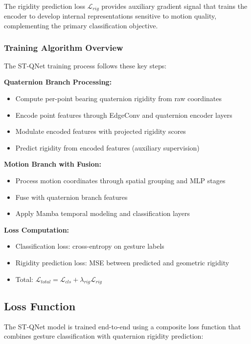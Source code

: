 \documentclass[journal]{IEEEtran}
\theoremstyle{plain}
\begin{document}
The rigidity prediction loss $\mathcal{L}_{rig}$ provides auxiliary gradient signal that trains the encoder to develop internal representations sensitive to motion quality, complementing the primary classification objective.

\subsubsection{Training Algorithm Overview}
The ST-QNet training process follows these key steps:

\textbf{Quaternion Branch Processing:}
\begin{itemize}
    \item Compute per-point bearing quaternion rigidity from raw coordinates
    \item Encode point features through EdgeConv and quaternion encoder layers
    \item Modulate encoded features with projected rigidity scores
    \item Predict rigidity from encoded features (auxiliary supervision)
\end{itemize}

\textbf{Motion Branch with Fusion:}
\begin{itemize}
    \item Process motion coordinates through spatial grouping and MLP stages
    \item Fuse with quaternion branch features
    \item Apply Mamba temporal modeling and classification layers
\end{itemize}

\textbf{Loss Computation:}
\begin{itemize}
    \item Classification loss: cross-entropy on gesture labels
    \item Rigidity prediction loss: MSE between predicted and geometric rigidity
    \item Total: $\mathcal{L}_{total} = \mathcal{L}_{cls} + \lambda_{rig} \mathcal{L}_{rig}$
\end{itemize}

\subsection{Loss Function}\label{sec:loss_function}
The ST-QNet model is trained end-to-end using a composite loss function that combines gesture classification with quaternion rigidity prediction:
\end{document}

